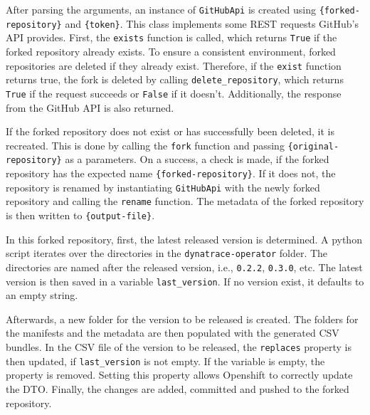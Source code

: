 After parsing the arguments, an instance of \verb|GitHubApi| is created using \verb|{forked-repository}| and \verb|{token}|.
This class implements some REST requests GitHub's API provides.
First, the \verb|exists| function is called, which returns \verb|True| if the forked repository already exists.
To ensure a consistent environment, forked repositories are deleted if they already exist.
Therefore, if the \verb|exist| function returns true, the fork is deleted by calling \verb|delete_repository|, which returns \verb|True| if the request succeeds or \verb|False| if it doesn't.
Additionally, the response from the GitHub API is also returned.

If the forked repository does not exist or has successfully been deleted, it is recreated.
This is done by calling the \verb|fork| function and passing \verb|{original-repository}| as a parameters.
On a success, a check is made, if the forked repository has the expected name \verb|{forked-repository}|.
If it does not, the repository is renamed by instantiating \verb|GitHubApi| with the newly forked repository and calling the \verb|rename| function.
The metadata of the forked repository is then written to \verb|{output-file}|.

In this forked repository, first, the latest released version is determined.
A python script iterates over the directories in the \verb|dynatrace-operator| folder.
The directories are named after the released version, i.e., \verb|0.2.2|, \verb|0.3.0|, etc.
The latest version is then saved in a variable \verb|last_version|.
If no version exist, it defaults to an empty string.

Afterwards, a new folder for the version to be released is created.
The folders for the manifests and the metadata are then populated with the generated CSV bundles.
In the CSV file of the version to be released, the \verb|replaces| property is then updated, if \verb|last_version| is not empty.
If the variable is empty, the property is removed.
Setting this property allows Openshift to correctly update the DTO.
Finally, the changes are added, committed and pushed to the forked repository.

